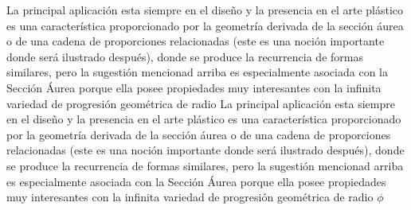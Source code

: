 \documentclass[a4paper]{book}
\begin{document}
La principal aplicación esta siempre en el diseño y la presencia en el arte plástico es una característica proporcionado por la geometría derivada de la sección áurea o de una cadena de proporciones relacionadas (este es una noción importante donde será ilustrado después), donde se produce la recurrencia de formas similares, pero la sugestión mencionad arriba es especialmente asociada con la Sección Áurea porque ella posee propiedades muy interesantes con la infinita variedad de progresión geométrica de radio
La principal aplicación esta siempre en el diseño y la presencia en el arte plástico es una característica proporcionado por la geometría derivada de la sección áurea o de una cadena de proporciones relacionadas (este es una noción importante donde será ilustrado después), donde se produce la recurrencia de formas similares, pero la sugestión mencionad arriba es especialmente asociada con la Sección Áurea porque ella posee propiedades muy interesantes con la infinita variedad de progresión geométrica de radio $\phi$
\end{document}

